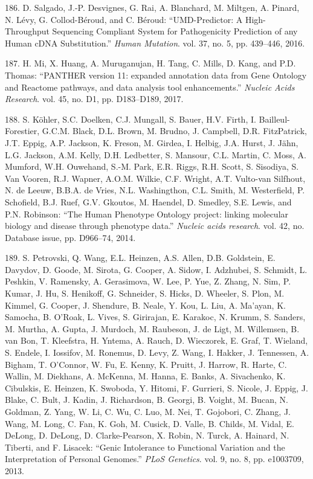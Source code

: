 \documentclass[12pt,a4paper,twoside]{ugathesis}
\theoremstyle{definition}
\theoremstyle{definition}
\theoremstyle{definition}
\theoremstyle{remark}
\begin{document}
\hypertarget{ref-Salgado2016a}{}
186. D. Salgado, J.-P. Desvignes, G. Rai, A. Blanchard, M. Miltgen, A.
Pinard, N. Lévy, G. Collod-Béroud, and C. Béroud: ``UMD-Predictor: A
High-Throughput Sequencing Compliant System for Pathogenicity Prediction
of any Human cDNA Substitution.'' \emph{Human Mutation}. vol. 37, no. 5,
pp. 439--446, 2016.

\hypertarget{ref-Mi2017}{}
187. H. Mi, X. Huang, A. Muruganujan, H. Tang, C. Mills, D. Kang, and
P.D. Thomas: ``PANTHER version 11: expanded annotation data from Gene
Ontology and Reactome pathways, and data analysis tool enhancements.''
\emph{Nucleic Acids Research}. vol. 45, no. D1, pp. D183--D189, 2017.

\hypertarget{ref-Kohler2014}{}
188. S. Köhler, S.C. Doelken, C.J. Mungall, S. Bauer, H.V. Firth, I.
Bailleul-Forestier, G.C.M. Black, D.L. Brown, M. Brudno, J. Campbell,
D.R. FitzPatrick, J.T. Eppig, A.P. Jackson, K. Freson, M. Girdea, I.
Helbig, J.A. Hurst, J. Jähn, L.G. Jackson, A.M. Kelly, D.H. Ledbetter,
S. Mansour, C.L. Martin, C. Moss, A. Mumford, W.H. Ouwehand, S.-M. Park,
E.R. Riggs, R.H. Scott, S. Sisodiya, S. Van Vooren, R.J. Wapner, A.O.M.
Wilkie, C.F. Wright, A.T. Vulto-van Silfhout, N. de Leeuw, B.B.A. de
Vries, N.L. Washingthon, C.L. Smith, M. Westerfield, P. Schofield, B.J.
Ruef, G.V. Gkoutos, M. Haendel, D. Smedley, S.E. Lewis, and P.N.
Robinson: ``The Human Phenotype Ontology project: linking molecular
biology and disease through phenotype data.'' \emph{Nucleic acids
research}. vol. 42, no. Database issue, pp. D966--74, 2014.

\hypertarget{ref-Petrovski2013}{}
189. S. Petrovski, Q. Wang, E.L. Heinzen, A.S. Allen, D.B. Goldstein, E.
Davydov, D. Goode, M. Sirota, G. Cooper, A. Sidow, I. Adzhubei, S.
Schmidt, L. Peshkin, V. Ramensky, A. Gerasimova, W. Lee, P. Yue, Z.
Zhang, N. Sim, P. Kumar, J. Hu, S. Henikoff, G. Schneider, S. Hicks, D.
Wheeler, S. Plon, M. Kimmel, G. Cooper, J. Shendure, B. Neale, Y. Kou,
L. Liu, A. Ma'ayan, K. Samocha, B. O'Roak, L. Vives, S. Girirajan, E.
Karakoc, N. Krumm, S. Sanders, M. Murtha, A. Gupta, J. Murdoch, M.
Raubeson, J. de Ligt, M. Willemsen, B. van Bon, T. Kleefstra, H. Yntema,
A. Rauch, D. Wieczorek, E. Graf, T. Wieland, S. Endele, I. Iossifov, M.
Ronemus, D. Levy, Z. Wang, I. Hakker, J. Tennessen, A. Bigham, T.
O'Connor, W. Fu, E. Kenny, K. Pruitt, J. Harrow, R. Harte, C. Wallin, M.
Diekhans, A. McKenna, M. Hanna, E. Banks, A. Sivachenko, K. Cibulskis,
E. Heinzen, K. Swoboda, Y. Hitomi, F. Gurrieri, S. Nicole, J. Eppig, J.
Blake, C. Bult, J. Kadin, J. Richardson, B. Georgi, B. Voight, M. Bucan,
N. Goldman, Z. Yang, W. Li, C. Wu, C. Luo, M. Nei, T. Gojobori, C.
Zhang, J. Wang, M. Long, C. Fan, K. Goh, M. Cusick, D. Valle, B. Childs,
M. Vidal, E. DeLong, D. DeLong, D. Clarke-Pearson, X. Robin, N. Turck,
A. Hainard, N. Tiberti, and F. Lisacek: ``Genic Intolerance to
Functional Variation and the Interpretation of Personal Genomes.''
\emph{PLoS Genetics}. vol. 9, no. 8, pp. e1003709, 2013.
\end{document}
